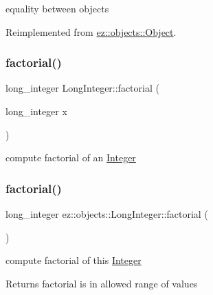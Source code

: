 equality between objects 

Reimplemented from \hyperlink{classez_1_1objects_1_1Object_aca311d389dffa204e425463145f4e1e6}{ez\+::objects\+::\+Object}.

\mbox{\label{classez_1_1objects_1_1LongInteger_a555e78bdf1c29fef8784e2e80ba97524}} 
\subsubsection{\texorpdfstring{factorial()}{factorial()}\hspace{0.1cm}{\footnotesize\ttfamily [1/2]}}
{\footnotesize\ttfamily long\+\_\+integer Long\+Integer\+::factorial (\begin{DoxyParamCaption}\item[{long\+\_\+integer}]{x }\end{DoxyParamCaption})\hspace{0.3cm}{\ttfamily [static]}}

compute factorial of an \hyperlink{classez_1_1objects_1_1Integer}{Integer} \mbox{\label{classez_1_1objects_1_1LongInteger_a0b63a198b5c4e0f2a05a400788fbc8a8}} 
\subsubsection{\texorpdfstring{factorial()}{factorial()}\hspace{0.1cm}{\footnotesize\ttfamily [2/2]}}
{\footnotesize\ttfamily long\+\_\+integer ez\+::objects\+::\+Long\+Integer\+::factorial (\begin{DoxyParamCaption}{ }\end{DoxyParamCaption})\hspace{0.3cm}{\ttfamily [inline]}}

compute factorial of this \hyperlink{classez_1_1objects_1_1Integer}{Integer} \begin{DoxyReturn}{Returns}
factorial is in allowed range of values 
\end{DoxyReturn}
\mbox{\label{classez_1_1objects_1_1LongInteger_a38a5c03d9a76cb536e5ae5a4032f49bf}} 
